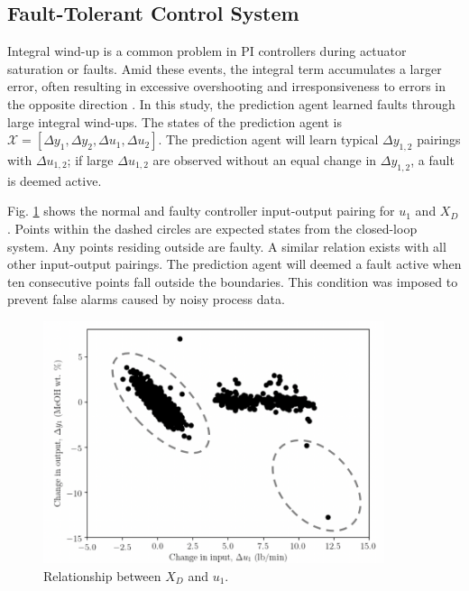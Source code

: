 \subsection{Fault-Tolerant Control System}
Integral wind-up is a common problem in PI controllers during actuator saturation or faults.  Amid these events, the integral term accumulates a larger error, often resulting in excessive overshooting and irresponsiveness to errors in the opposite direction \cite{process_control_ref13}. In this study, the prediction agent learned faults through large integral wind-ups.  The states of the prediction agent is ${\mathcal{X}} = [\Delta y_1, \Delta y_2, \Delta u_1, \Delta u_2]$. The prediction agent will learn typical $\Delta y_{1, 2}$ pairings with $\Delta u_{1, 2}$; if large $\Delta u_{1, 2}$ are observed without an equal change in $\Delta y_{1, 2}$, a fault is deemed active.

Fig. \ref{fig:FDS} shows the normal and faulty controller input-output pairing for $u_1$ and $X_D$. Points within the dashed circles are expected states from the closed-loop system. Any points residing outside are faulty. A similar relation exists with all other input-output pairings. The prediction agent will deemed a fault active when ten consecutive points fall outside the boundaries. This condition was imposed to prevent false alarms caused by noisy process data.
\begin{figure}[H]
    \begin{center}
        \includegraphics[width=10cm]{images/ftc/Boundaries.png}
        \caption{\label{fig:FDS} Relationship between $X_D$ and $u_1$.}
    \end{center}
\end{figure}

